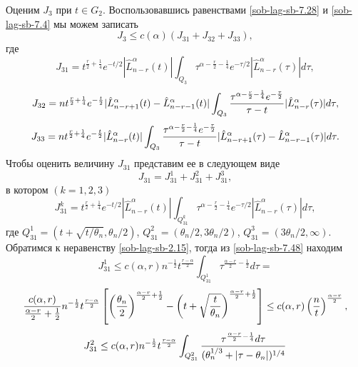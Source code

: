 Оценим $J_3$ при $t\in G_2$. Воспользовавшись равенствами \eqref{sob-lag-sb-7.28} и \eqref{sob-lag-sb-7.4} мы можем записать
\begin{equation}\label{sob-lag-sb-7.43}
J_3\le c(\alpha)(J_{31}+J_{32}+J_{33}),
\end{equation}
где
\begin{equation}\label{sob-lag-sb-7.44}
J_{31}=t^{\frac{r}{2}+\frac14}e^{-t/2}|\hat L_{n-r}^\alpha(t)|\int_{Q_3}\tau^{\alpha-\frac{r}{2}-\frac14}e^{-\tau/2}|\hat L_{n-r}^\alpha(\tau)|d\tau,
\end{equation}
\begin{equation}\label{sob-lag-sb-7.45}
J_{32}=nt^{\frac{r}{2}+\frac14}e^{-\frac{t}{2}}|\hat L_{n-r+1}^\alpha(t)-\hat L_{n-r-1}^\alpha(t)|\int_{Q_3}{\tau^{\alpha-\frac{r}{2}-\frac14}e^{-\frac{\tau}{2}}\over \tau-t}|\hat L_{n-r}^\alpha(\tau)|d\tau, \end{equation}
\begin{equation}\label{sob-lag-sb-7.46}
J_{33}=nt^{\frac{r}{2}+\frac14}e^{-\frac{t}{2}}|\hat L_{n-r}^\alpha(t)|\int_{Q_3}{\tau^{\alpha-\frac{r}{2}-\frac14}e^{-\frac{\tau}{2}}\over \tau-t}|\hat L_{n-r+1}^\alpha(\tau)-\hat L_{n-r-1}^\alpha(\tau)|d\tau.
\end{equation}
Чтобы оценить величину $J_{31}$ представим ее в следующем виде
\begin{equation}\label{sob-lag-sb-7.47}
J_{31}=J_{31}^1+J_{31}^2+J_{31}^3,
\end{equation}
в котором $(k=1,2,3)$
\begin{equation}\label{sob-lag-sb-7.48}
J_{31}^k=t^{\frac{r}{2}+\frac14}e^{-t/2}|\hat L_{n-r}^\alpha(t)|\int_{Q_{31}^k}\tau^{\alpha-\frac{r}{2}-\frac14}e^{-\tau/2}|\hat L_{n-r}^\alpha(\tau)|d\tau,
\end{equation}
где $Q_{31}^1=(t+\sqrt{t/\theta_n},\theta_n/2)$, $Q_{31}^2=(\theta_n/2,3\theta_n/2)$, $Q_{31}^3=(3\theta_n/2,\infty)$. Обратимся к  неравенству \eqref{sob-lag-sb-2.15}, тогда из  \eqref{sob-lag-sb-7.48} находим
$$
J_{31}^1\le c(\alpha,r)n^{-\frac12}t^\frac{r-\alpha}{2}\int_{Q_{31}^1}\tau^{\frac{\alpha-r}{2}-\frac12}d\tau=
$$
\begin{equation}\label{sob-lag-sb-7.49}
{c(\alpha,r)\over\frac{\alpha-r}{2}+\frac12}n^{-\frac12}t^\frac{r-\alpha}{2}\left[\left(\frac{\theta_n}{2}\right)^{\frac{\alpha-r}{2}+\frac12}-
\left(t+\sqrt{\frac{t}{\theta_n}}\right)^{\frac{\alpha-r}{2}+\frac12}\right]\le
c(\alpha,r)\left(\frac{n}{t}\right)^{\frac{\alpha-r}{2}},
\end{equation}
$$
J_{31}^2\le c(\alpha,r)n^{-\frac12}t^\frac{r-\alpha}{2}\int_{Q_{31}^2}{\tau^{\frac{\alpha-r}{2}-\frac14}d\tau\over(\theta_n^{1/3}+|\tau-\theta_n|)^{1/4}}
$$
